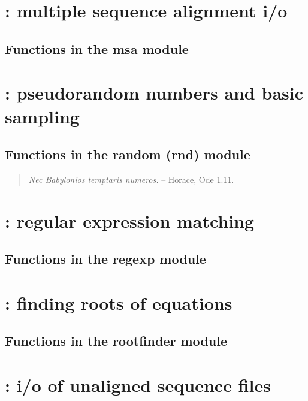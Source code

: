\documentclass[10pt]{book}
\begin{document}
\newpage
\section{: multiple sequence alignment i/o}

\subsection{Functions in the msa module}


\newpage
\section{: pseudorandom numbers and basic sampling}

\subsection{Functions in the random (rnd) module}

\vspace*{\fill}

\begin{quote}
\emph{Nec Babylonios temptaris numeros.} \hspace{3em} -- Horace, Ode
1.11. \\ 
\end{quote}     

\newpage
\section{: regular expression matching}

\subsection{Functions in the regexp module}


\newpage
\section{: finding roots of equations}

\subsection{Functions in the rootfinder module}


\newpage
\section{: i/o of unaligned sequence files}

\end{document}
